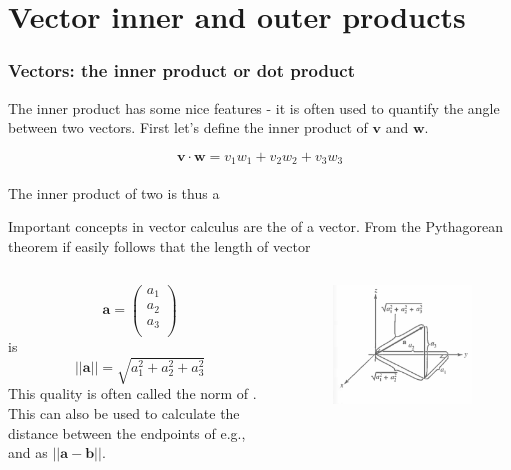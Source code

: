 \documentclass{beamer}
\begin{document}
\section{Vector inner and outer products}
\begin{frame}
\frametitle{Vectors: the inner product or dot product}
The inner product has some nice features - it is often used to quantify the angle between two vectors. First let's define the inner product of $\mathbf{v}$ and $\mathbf{w}$.


$$ \mathbf{v} \cdot \mathbf{w} = v_1w_1 + v_2w_2 + v_3w_3$$\\[1cm]
The inner product of two  {} is thus a  {}

\end{frame}
\begin{frame}
Important concepts in vector calculus are the  of a vector. From the Pythagorean theorem if easily follows that the length of vector
\begin{columns}[c]

	$$\mathbf{a} = \left(
		\begin{array}{c}
		a_1\\
		a_2\\
		a_3\\
		\end{array}
	\right)$$
is $$|| \mathbf{a}  || = \sqrt{a_{1}^{2} + a_{2}^{2} + a_{3}^{2} }$$
This quality is often called the norm of  . This can also be used to calculate the distance between the endpoints of e.g.,  and  as $||\mathbf{a}-\mathbf{b}||$.    

\begin{figure}[htbp]
\begin{center}
\includegraphics[width=1.1\textwidth]{fig_pyth.png}
\end{center}
\end{figure}
\end{columns}
\end{frame}
\end{document}
